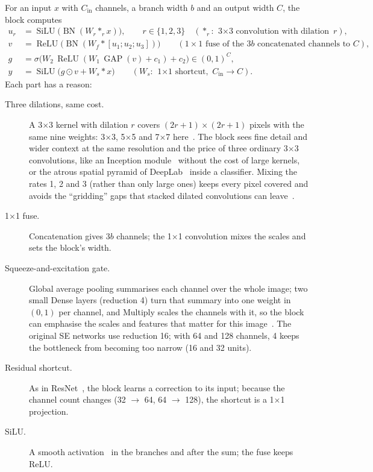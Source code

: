 \documentclass[11pt,a4paper]{article}
\begin{document}
For an input $x$ with $C_{\text{in}}$ channels, a branch width $b$ and an output width $C$, the block computes
\begin{align}
  u_r &= \operatorname{SiLU}\bigl(\operatorname{BN}(W_r \ast_r x)\bigr), \qquad r \in \{1, 2, 3\}\quad(\ast_r:\ \text{3$\times$3 convolution with dilation } r),\\
  v &= \operatorname{ReLU}\bigl(\operatorname{BN}(W_f \ast [u_1; u_2; u_3])\bigr) \qquad (\text{1$\times$1 fuse of the $3b$ concatenated channels to } C),\\
  g &= \sigma\bigl(W_2\, \operatorname{ReLU}(W_1\, \operatorname{GAP}(v) + c_1) + c_2\bigr) \in (0,1)^{C},\\
  y &= \operatorname{SiLU}\bigl(g \odot v + W_s \ast x\bigr) \qquad (W_s:\ \text{1$\times$1 shortcut, } C_{\text{in}} \rightarrow C).
\end{align}
Each part has a reason:
\begin{description}
  \item[Three dilations, same cost.] A 3$\times$3 kernel with dilation $r$ covers $(2r+1)\times(2r+1)$ pixels with the same nine weights:
        3$\times$3, 5$\times$5 and 7$\times$7 here~\cite{yu2015dilated}. The block sees fine detail and wider context at the same
        resolution and the price of three ordinary 3$\times$3 convolutions, like an Inception module~\cite{szegedy2014going} without
        the cost of large kernels, or the atrous spatial pyramid of DeepLab~\cite{chen2017deeplabv3} inside a classifier. Mixing the
        rates 1, 2 and 3 (rather than only large ones) keeps every pixel covered and avoids the ``gridding'' gaps that stacked dilated
        convolutions can leave~\cite{wang2017hdc}.
  \item[1$\times$1 fuse.] Concatenation gives $3b$ channels; the 1$\times$1 convolution mixes the scales and sets the block's width.
  \item[Squeeze-and-excitation gate.] Global average pooling summarises each channel over the whole image; two small Dense layers
        (reduction 4) turn that summary into one weight in $(0,1)$ per channel, and Multiply scales the channels with it, so the block can
        emphasise the scales and features that matter for this image~\cite{hu2017senet}. The original SE networks use reduction 16;
        with 64 and 128 channels, 4 keeps the bottleneck from becoming too narrow (16 and 32 units).
  \item[Residual shortcut.] As in ResNet~\cite{he2015resnet}, the block learns a correction to its input; because the channel count
        changes (32 $\rightarrow$ 64, 64 $\rightarrow$ 128), the shortcut is a 1$\times$1 projection.
  \item[SiLU.] A smooth activation~\cite{ramachandran2017swish} in the branches and after the sum; the fuse keeps ReLU.
\end{description}
\end{document}
